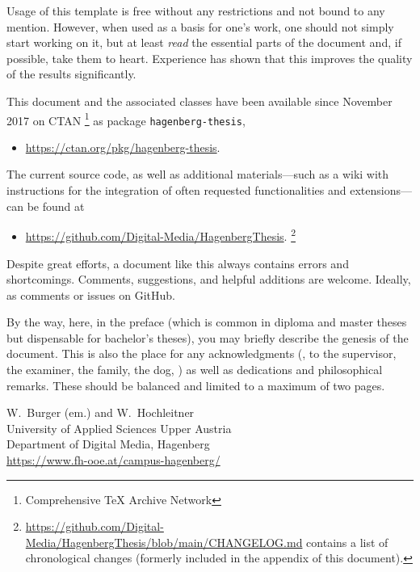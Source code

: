 Usage of this template is free without any restrictions and not bound to any
mention. However, when used as a basis for one's work, one should not simply
start working on it, but at least \emph{read} the essential parts of the
document and, if possible, take them to heart. Experience has shown that this
improves the quality of the results significantly.

This document and the associated \latex classes have been available since
November 2017 on CTAN%
\footnote{Comprehensive TeX Archive Network} 
as package \texttt{hagenberg-thesis},
%
\begin{itemize}
	\item[]\url{https://ctan.org/pkg/hagenberg-thesis}.
\end{itemize}
%
The current source code, as well as additional materials---such as a wiki with
instructions for the integration of often requested functionalities and
extensions---can be found at
%
\begin{itemize}
  \item[]\url{https://github.com/Digital-Media/HagenbergThesis}.%
  \footnote{\url{https://github.com/Digital-Media/HagenbergThesis/blob/main/CHANGELOG.md}
  contains a list of chronological changes (formerly included in the appendix
  of this document).}
\end{itemize}

\noindent
Despite great efforts, a document like this always contains errors and
shortcomings. Comments, suggestions, and helpful additions are welcome.
Ideally, as comments or issues on GitHub.

By the way, here, in the preface (which is common in diploma and master theses
but dispensable for bachelor's theses), you may briefly describe the genesis of
the document. This is also the place for any acknowledgments (\eg, to the
supervisor, the examiner, the family, the dog, \etc) as well as dedications and
philosophical remarks. These should be balanced and limited to a maximum of two
pages.

\vspace{6ex}
\noindent
W.\ Burger (em.) and W.\ Hochleitner\\[1ex]
University of Applied Sciences Upper Austria\\ 
Department of Digital Media, Hagenberg\\
\url{https://www.fh-ooe.at/campus-hagenberg/}
